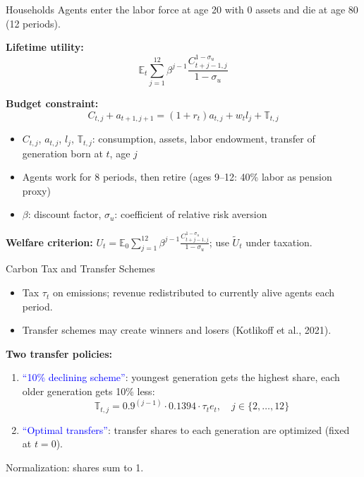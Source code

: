 \documentclass[aspectratio=169,11pt]{beamer}
\newcommand{\emphc}[1]{\textcolor{harvardcrimson}{#1}}
\begin{document}
\begin{frame}{Households}
\small
Agents enter the labor force at age 20 with 0 assets and die at age 80 (12 periods).

\vspace{0.2cm}
\textbf{Lifetime utility:}
\[
\mathbb{E}_t \sum_{j=1}^{12} \beta^{j-1} \frac{C_{t+j-1,j}^{1-\sigma_u}}{1-\sigma_u}
\]

\textbf{Budget constraint:}
\[
C_{t,j} + a_{t+1,j+1} = (1+r_t) a_{t,j} + w_t l_j + \mathbb{T}_{t,j}
\]

\begin{itemize}
    \item $C_{t,j}$, $a_{t,j}$, $l_j$, $\mathbb{T}_{t,j}$: consumption, assets, labor endowment, transfer of generation born at $t$, age $j$
    \item Agents work for 8 periods, then retire (ages 9--12: 40\% labor as pension proxy)
    \item $\beta$: discount factor, $\sigma_u$: coefficient of relative risk aversion
\end{itemize}

\vspace{0.2cm}
\textbf{Welfare criterion:} $U_t = \mathbb{E}_0 \sum_{j=1}^{12} \beta^{j-1} \frac{C_{t+j-1,j}^{1-\sigma_u}}{1-\sigma_u}$; \; use $\tilde{U}_t$ under taxation.
\end{frame}

\begin{frame}{Carbon Tax and Transfer Schemes}
\small
\begin{itemize}
    \item Tax $\tau_t$ on emissions; revenue redistributed to currently alive agents each period.
    \item Transfer schemes may create \emphc{winners and losers} (Kotlikoff et al., 2021).
\end{itemize}

\vspace{0.2cm}
\textbf{Two transfer policies:}
\begin{enumerate}
    \item \textcolor{blue}{``10\% declining scheme''}: youngest generation gets the highest share, each older generation gets 10\% less:
    \[
    \mathbb{T}_{t,j} = 0.9^{(j-1)} \cdot 0.1394 \cdot \tau_t e_t, \quad j \in \{2, \ldots, 12\}
    \]
    \item \textcolor{blue}{``Optimal transfers''}: transfer shares to each generation are \emphc{optimized} (fixed at $t=0$).
\end{enumerate}

\vspace{0.2cm}
Normalization: shares sum to 1.
\end{frame}
\end{document}
